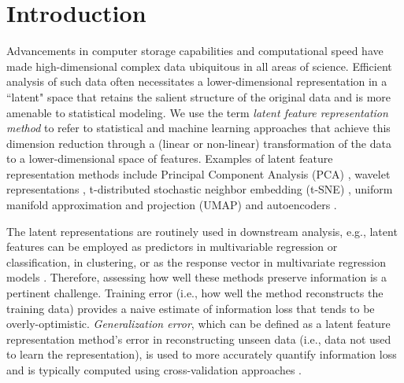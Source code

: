 \section{Introduction}

Advancements in computer storage capabilities and computational speed have made high-dimensional complex data ubiquitous in all areas of science.
Efficient analysis of such data often necessitates a lower-dimensional representation in a ``latent" space that retains the salient structure of the original data and is more amenable to statistical modeling.
We use the term \emph{latent feature representation method} to refer to statistical and machine learning approaches that achieve this dimension reduction through a (linear or non-linear) transformation of the data to a lower-dimensional space of features.
Examples of latent feature representation methods include Principal Component Analysis (PCA) \parencite{hotelling_analysis_1933}, wavelet representations \parencite{daubechies_wavelet_1990}, t-distributed stochastic neighbor embedding (t-SNE) \parencite{maaten_visualizing_2008}, uniform manifold approximation and projection (UMAP) \parencite{mcinnes_umap_2020} and autoencoders \parencite{rumelhart_learning_1986}.

The latent representations are routinely used in downstream analysis, e.g., latent features can be employed as predictors in multivariable regression or classification, in clustering, or as the response vector in multivariate regression models \parencite{niu_dimensionality_2011,wang_role_2014, cook_fisher_2007}. 
Therefore, assessing how well these methods preserve information is a pertinent challenge.
Training error (i.e., how well the method reconstructs the training data) provides a naive estimate of information loss that tends to be overly-optimistic.
\emph{Generalization error}, which can be defined as a latent feature representation method's error in reconstructing unseen data (i.e., data not used to learn the representation), is used to more accurately quantify information loss and is typically computed using cross-validation approaches \parencite[see, e.g.,][]{becht_dimensionality_2019, bro_cross-validation_2008, wold_cross-validatory_1978, eastment_cross-validatory_1982,krzanowski_cross-validation_1987, minka_automatic_2000, rajan_bayesian_1994, camacho_cross-validation_2014, diana_cross-validation_2002, hubert_fast_2007, josse_selecting_2012, saccenti_use_2015}.

